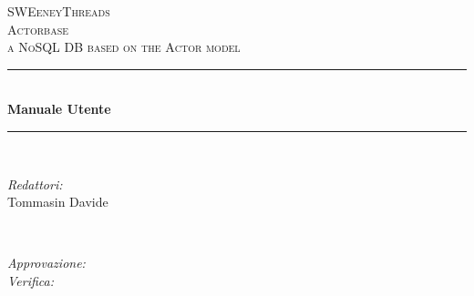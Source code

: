 \documentclass[a4paper]{article}
\begin{document}
	
	\begin{titlepage}
		\newcommand{\HRule}{\rule{\linewidth}{0.5mm}} 
		\center  
		
		\textsc{\LARGE SWEeneyThreads}\\[1.5cm] 
		\textsc{\Large Actorbase}\\[0.5cm] 
		\textsc{\large a NoSQL DB based on the Actor model}\\[0.5cm]
		
		
		\HRule \\[0.4cm]
		{ \huge \bfseries Manuale Utente}\\[0.4cm] 
		\HRule \\[1.5cm]
		
		\begin{minipage}{0.4\textwidth}
			\begin{flushleft} \large
				\emph{Redattori:}\\
				Tommasin Davide \\
			\end{flushleft}
		\end{minipage}
		~
		\begin{minipage}{0.4\textwidth}
			\begin{flushright} \large
				\emph{Approvazione:} \\
				\emph{Verifica:} 
			\end{flushright}
		\end{minipage}
		

\end{titlepage}
\end{document}
